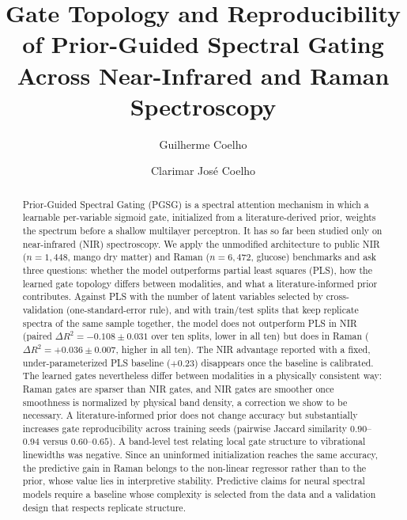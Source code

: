 \documentclass[preprint,12pt]{elsarticle}
\begin{document}
\begin{frontmatter}

\title{Gate Topology and Reproducibility of Prior-Guided Spectral Gating Across Near-Infrared and Raman Spectroscopy}


 
\author[unicamp]{Guilherme Coelho}
\author[puc]{Clarimar José Coelho}
\address[unicamp]{State University of Campinas, 
            Cidade Universitária Zeferino Vaz - Barão Geraldo, 
            Campinas,
            13083--970, 
            São Paulo,
            Brazil}
\address[puc]{Postgraduate Program in Industrial Engineering and Artificial Intelligence Pontificia Universidade Catolica de Goias, Primeira Avenida, s/n - Quadra 88 - Setor Leste Universitário, 
            Goiânia, 74605--010, Goiás, Brazil} 


\begin{abstract}
Prior-Guided Spectral Gating (PGSG) is a spectral attention mechanism in which a learnable per-variable sigmoid gate, initialized from a literature-derived prior, weights the spectrum before a shallow multilayer perceptron. It has so far been studied only on near-infrared (NIR) spectroscopy. We apply the unmodified architecture to public NIR ($n=1{,}448$, mango dry matter) and Raman ($n=6{,}472$, glucose) benchmarks and ask three questions: whether the model outperforms partial least squares (PLS), how the learned gate topology differs between modalities, and what a literature-informed prior contributes. Against PLS with the number of latent variables selected by cross-validation (one-standard-error rule), and with train/test splits that keep replicate spectra of the same sample together, the model does not outperform PLS in NIR (paired $\Delta R^{2}=-0.108\pm0.031$ over ten splits, lower in all ten) but does in Raman ($\Delta R^{2}=+0.036\pm0.007$, higher in all ten). The NIR advantage reported with a fixed, under-parameterized PLS baseline ($+0.23$) disappears once the baseline is calibrated. The learned gates nevertheless differ between modalities in a physically consistent way: Raman gates are sparser than NIR gates, and NIR gates are smoother once smoothness is normalized by physical band density, a correction we show to be necessary. A literature-informed prior does not change accuracy but substantially increases gate reproducibility across training seeds (pairwise Jaccard similarity $0.90$--$0.94$ versus $0.60$--$0.65$). A band-level test relating local gate structure to vibrational linewidths was negative. Since an uninformed initialization reaches the same accuracy, the predictive gain in Raman belongs to the non-linear regressor rather than to the prior, whose value lies in interpretive stability. Predictive claims for neural spectral models require a baseline whose complexity is selected from the data and a validation design that respects replicate structure.
\end{abstract}


\end{frontmatter}
\end{document}
